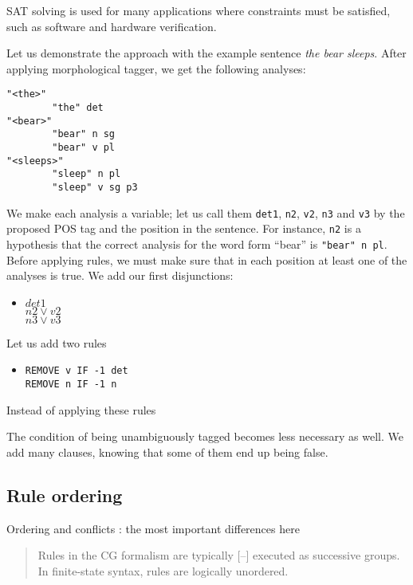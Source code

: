 \documentclass[11pt]{article}
\begin{document}
SAT solving is used for many applications where constraints must be
satisfied, such as software and hardware verification.

Let us demonstrate the approach with the example sentence 
\emph{the bear sleeps}. After applying morphological tagger, we get the following analyses:

\begin{verbatim}
"<the>"
        "the" det
"<bear>"
        "bear" n sg
        "bear" v pl
"<sleeps>"
        "sleep" n pl
        "sleep" v sg p3
\end{verbatim}

We make each analysis a variable; let us call them \texttt{det1}, \texttt{n2}, \texttt{v2}, \texttt{n3} and \texttt{v3} by the proposed POS tag and the position in the sentence.
For instance, \texttt{n2} is a hypothesis that the correct analysis 
for the word form ``bear'' is \texttt{"bear" n pl}.
Before applying rules, we must make sure that in each position
at least one of the analyses is true. We add our first disjunctions:

\begin{itemize}
\item [] $det1$ \\ $n2 \vee v2$ \\ $n3 \vee v3$
\end{itemize}

Let us add two rules
\begin{itemize}
\item [] \texttt{REMOVE v IF -1 det} \\ \texttt{REMOVE n IF -1 n}
\end{itemize}

Instead of applying these rules 

The condition of being unambiguously tagged becomes less necessary as well.
We add many clauses, knowing that some of them end up being false.

\subsection{Rule ordering}
\label{ssec:ordering}

Ordering and conflicts : the most important differences here

\cite{koskenniemi92}
\begin{quote}Rules in the CG formalism are typically [--] executed as successive groups.
In finite-state syntax, rules are logically unordered.\end{quote}
\end{document}

